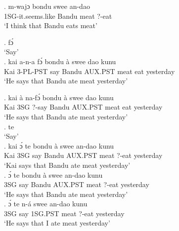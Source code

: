 \documentclass{assets/fieldnotes}
\begin{document}
\exg. m-wajɔ bondu swee an-dao\\
1SG-it.seems.like Bandu meat ?-eat\\
    `I think that Bandu eats meat'\\



\ex. fɔ́\\
    `Say'\\

\exg. kai a-n-a fɔ́ bondu à swee dao kunu\\
Kai 3-PL-PST say Bandu AUX.PST meat eat yesterday\\
    `He says that Bandu ate meat yesterday'\\


\exg. kai à na-fɔ́ bondu à swee dao kunu\\
Kai 3SG ?-say Bandu AUX.PST meat eat yesterday\\
    `He says that Bandu ate meat yesterday'\\

\ex. te\\
    `Say' \\

\exg. kai ɔ́ te bondu à swee an-dao kunu\\
Kai 3SG say Bandu AUX.PST meat ?-eat yesterday\\
    `Kai says that Bandu ate meat yesterday'\\



\exg. ɔ́ te bondu à swee an-dao kunu\\
3SG say Bandu AUX.PST meat ?-eat yesterday\\
    `He says that Bandu ate meat yesterday'\\

\exg.  ɔ́ te n-á swee an-dao kunu\\
3SG say 1SG.PST meat ?-eat yesterday\\
    `He says that I ate meat yesterday'\\
\end{document}
